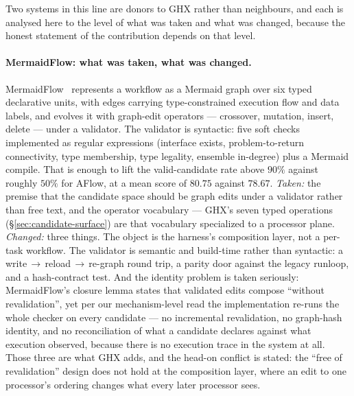 Two systems in this line are donors to GHX rather than neighbours, and
each is analysed here to the level of what was taken and what was
changed, because the honest statement of the contribution depends on
that level.

\paragraph{MermaidFlow: what was taken, what was changed.}
MermaidFlow~\cite{mermaidflow} represents a workflow as a Mermaid graph
over six typed declarative units, with edges carrying type-constrained
execution flow and data labels, and evolves it with graph-edit operators
--- crossover, mutation, insert, delete --- under a validator. The
validator is syntactic: five soft checks implemented as regular
expressions (interface exists, problem-to-return connectivity, type
membership, type legality, ensemble in-degree) plus a Mermaid compile.
That is enough to lift the valid-candidate rate above $90\%$ against
roughly $50\%$ for AFlow, at a mean score of $80.75$ against $78.67$.
\emph{Taken:} the premise that the candidate space should be graph edits
under a validator rather than free text, and the operator vocabulary ---
GHX's seven typed operations (\S\ref{sec:candidate-surface}) are that
vocabulary specialized to a processor plane. \emph{Changed:} three
things. The object is the harness's composition layer, not a per-task
workflow. The validator is semantic and build-time rather than syntactic:
a write\,$\to$\,reload\,$\to$\,re-graph round trip, a parity door against
the legacy runloop, and a hash-contract test. And the identity problem is
taken seriously: MermaidFlow's closure lemma states that validated edits
compose ``without revalidation'', yet per our mechanism-level read the
implementation re-runs the whole checker on every candidate --- no
incremental revalidation, no graph-hash identity, and no reconciliation
of what a candidate declares against what execution observed, because
there is no execution trace in the system at all. Those three are what
GHX adds, and the head-on conflict is stated: the ``free of
revalidation'' design does not hold at the composition layer, where an
edit to one processor's ordering changes what every later processor
sees.

